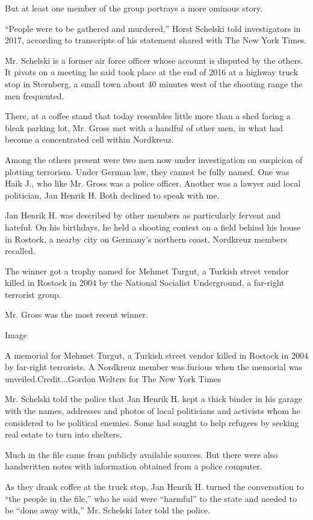 But at least one member of the group portrays a more ominous story.

``People were to be gathered and murdered,'' Horst Schelski told
investigators in 2017, according to transcripts of his statement shared
with The New York Times.

Mr. Schelski is a former air force officer whose account is disputed by
the others. It pivots on a meeting he said took place at the end of 2016
at a highway truck stop in Sternberg, a small town about 40 minutes west
of the shooting range the men frequented.

There, at a coffee stand that today resembles little more than a shed
facing a bleak parking lot, Mr. Gross met with a handful of other men,
in what had become a concentrated cell within Nordkreuz.

Among the others present were two men now under investigation on
suspicion of plotting terrorism. Under German law, they cannot be fully
named. One was Haik J., who like Mr. Gross was a police officer. Another
was a lawyer and local politician, Jan Henrik H. Both declined to speak
with me.

Jan Henrik H. was described by other members as particularly fervent and
hateful. On his birthdays, he held a shooting contest on a field behind
his house in Rostock, a nearby city on Germany's northern coast,
Nordkreuz members recalled.

The winner got a trophy named for Mehmet Turgut, a Turkish street vendor
killed in Rostock in 2004 by the National Socialist Underground, a
far-right terrorist group.

Mr. Gross was the most recent winner.

Image

A memorial for Mehmet Turgut, a Turkish street vendor killed in Rostock
in 2004 by far-right terrorists. A Nordkreuz member was furious when the
memorial was unveiled.Credit...Gordon Welters for The New York Times

Mr. Schelski told the police that Jan Henrik H. kept a thick binder in
his garage with the names, addresses and photos of local politicians and
activists whom he considered to be political enemies. Some had sought to
help refugees by seeking real estate to turn into shelters.

Much in the file came from publicly available sources. But there were
also handwritten notes with information obtained from a police computer.

As they drank coffee at the truck stop, Jan Henrik H. turned the
conversation to ``the people in the file,'' who he said were ``harmful''
to the state and needed to be ``done away with,'' Mr. Schelski later
told the police.

